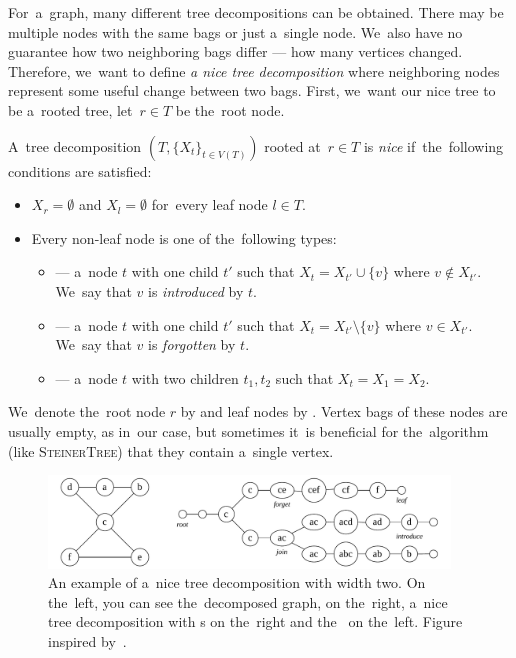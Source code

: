 For~a~graph, many different tree decompositions can be obtained.
There may be multiple nodes with the same bags or just a~single node.
We~also have no guarantee how two neighboring bags differ --- how many vertices changed.
Therefore, we~want to define \emph{a nice tree decomposition} where neighboring nodes
represent some useful change between two bags.
First, we~want our nice tree to be a~rooted tree,
let~\( r \in T \) be the~root node.
%
\begin{definition}
	A~tree decomposition \newline
	\( (T, {\{X_t\}}_{t \in V ( T )}) \) rooted at~\( r \in T \)
	is \emph{nice} if~the~following conditions are satisfied:
	\begin{itemize}
		\item \( X_r = \emptyset \) and \( X_l = \emptyset \) for~every leaf node \( l \in T \).
		\item Every non-leaf node is one of the~following types:
		      \begin{itemize}
			      \item \IntroduceVertexNode{} --- a~node \( t \) with one child \( t' \)
			            such that \( X_t = X_{t'} \cup \{v\} \) where \( v \not\in X_{t'} \).
			            We~say that \( v \) is \emph{introduced} by \( t \).
			      \item \ForgetVertexNode{} --- a~node \( t \) with one child \( t' \)
			            such that \( X_t = X_{t'} \setminus \{v\} \) where \( v \in X_{t'} \).
			            We~say that \( v \) is \emph{forgotten} by \( t \).
			      \item \JoinNode{} --- a~node \( t \) with two children \( t_1, t_2 \)
			            such that \( X_t = X_1 = X_2 \).
		      \end{itemize}
	\end{itemize}
	We~denote the~root node \( r \) by \RootNode{} and leaf nodes by \LeafNode{}.
	Vertex bags of these nodes are usually empty, as in~our case,
	but sometimes it~is beneficial
	for the~algorithm (like \textsc{SteinerTree}) that they contain a~single vertex.
\end{definition}
%
\begin{figure}[ht]
	\begin{center}
		\includegraphics[width=0.95\textwidth]{./assets/nice_tree_decomposition}
	\end{center}
	\caption[Nice tree decomposition]{
		An example of a~nice tree decomposition with width two.
		On the~left, you can see the~decomposed graph,
		on the~right, a~nice tree decomposition
		with \LeafNode{}s on the~right and the~\RootNode{} on the~left.
		Figure inspired by~\cite{nice_tree_decomposition_img}.
	}%
	\label{fig:nice_tree_decomposition}
\end{figure}

